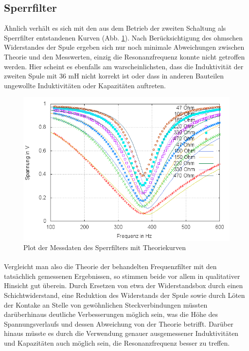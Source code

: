 \subsection{Sperrfilter}
Ähnlich verhält es sich mit den aus dem Betrieb der zweiten Schaltung als Sperrfilter entstandenen Kurven (Abb. \ref{plot:sperr}). Nach Berücksichtigung des ohmschen Widerstandes der Spule ergeben sich nur noch minimale Abweichungen zwischen Theorie und den Messwerten, einzig die Resonanzfrequenz konnte nicht getroffen werden. Hier scheint es ebenfalls am warscheinlichsten, dass die Induktivität der zweiten Spule mit 36 mH nicht korrekt ist oder dass in anderen Bauteilen ungewollte Induktivitäten oder Kapazitäten auftreten.
\\
\begin{figure}[h]
        \includegraphics[width=.9\textwidth]{images/plot/sperrfilter+theorie+R_L.png}
\caption{Plot der Messdaten des Sperrfilters mit Theoriekurven}
\label{plot:sperr}
\end{figure}

\paragraph{}Vergleicht man also die Theorie der behandelten Frequenzfilter mit den tatsächlich gemessenen Ergebnissen, so stimmen beide vor allem in qualitativer Hinsicht gut überein. Durch Ersetzen von etwa der Widerstandsbox durch einen Schichtwiderstand, eine Reduktion des Widerstands der Spule sowie durch Löten der Kontake an Stelle von gewöhnlichen Steckverbindungen müssten darüberhinaus deutliche Verbesserungen möglich sein, was die Höhe des Spannungsverlaufs und dessen Abweichung von der Theorie betrifft. 
Darüber hinaus müsste es durch die Verwendung genauer ausgemessener Induktivitäten und Kapazitäten auch möglich sein, die Resonanzfrequenz besser zu treffen. 